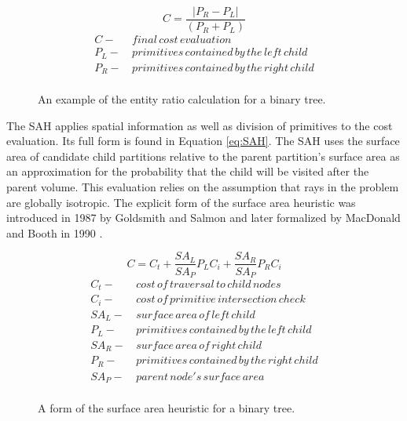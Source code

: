 \begin{figure}[H]
\begin{equation}
\label{eq:ERH}
 C = \frac{|P_{R}-P_{L}|}{(P_{R} + P_{L})} 
\end{equation}
  \begin{align*}
    C - & \,final \, cost \, evaluation \\
    P_{L} - & \, primitives\, contained\, by\, the\, left\, child  \\
    P_{R} - & \, primitives\, contained\, by\, the\, right\, child \\
  \end{align*}
  \caption{An example of the entity ratio calculation for a binary tree.}
  \label{fig:ERH}
\end{figure}

The SAH applies spatial information as well as division of primitives to the
cost evaluation. Its full form is found in Equation \ref{eq:SAH}. The SAH uses
the surface area of candidate child partitions relative to the parent
partition's surface area as an approximation for the probability that the child
will be visited after the parent volume. This evaluation relies on the
assumption that rays in the problem are globally isotropic. The explicit form of
the surface area heuristic was introduced in 1987 by Goldsmith and Salmon
\cite{Goldsmith_1987} and later formalized by MacDonald and Booth in 1990
\cite{MacDonald_1990}.

\begin{figure}[H]
  \begin{equation}
    C =  C_{t} + \frac{SA_{L}}{SA_{P}}P_{L}C_{i} +  \frac{SA_{R}}{SA_{P}}P_{R}C_{i}
    \label{eq:SAH}
  \end{equation}
  \begin{align*}
    C_{t} - & \,cost\, of\, traversal\, to\, child\, nodes \\
    C_{i} - & \, cost\, of\, primitive\, intersection\, check\, \\
    SA_{L} - &  \,surface\, area\, of\, left\, child \\
    P_{L} - & \, primitives\, contained\, by\, the\, left\, child  \\
    SA_{R} - & \, surface\, area\, of\, right\, child \\
    P_{R} - & \, primitives\, contained\, by\, the\, right\, child \\
    SA_{P} - & \, parent\, node's \, surface \, area \\
  \end{align*}
  \caption{A form of the surface area heuristic for a binary tree.}
  \label{fig:SAH}
\end{figure}

